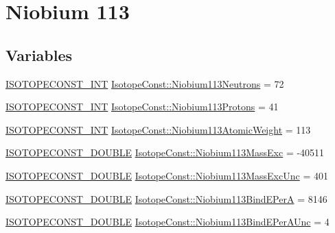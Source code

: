 \hypertarget{group___isotope_const-_niobium-_nb113}{}\section{Niobium 113}
\label{group___isotope_const-_niobium-_nb113}
\subsection*{Variables}
\begin{DoxyCompactItemize}
\item 
\mbox{\hyperlink{group___isotope_const-_macros_ga5f18360b3e99483a35c32d789e62621c}{I\+S\+O\+T\+O\+P\+E\+C\+O\+N\+S\+T\+\_\+\+I\+NT}} \mbox{\hyperlink{group___isotope_const-_niobium-_nb113_ga5322e770be1b10939fe8ea9e373ab884}{Isotope\+Const\+::\+Niobium113\+Neutrons}} = 72
\item 
\mbox{\hyperlink{group___isotope_const-_macros_ga5f18360b3e99483a35c32d789e62621c}{I\+S\+O\+T\+O\+P\+E\+C\+O\+N\+S\+T\+\_\+\+I\+NT}} \mbox{\hyperlink{group___isotope_const-_niobium-_nb113_gabbebea2fefdadbde0b1c22a75418cbb8}{Isotope\+Const\+::\+Niobium113\+Protons}} = 41
\item 
\mbox{\hyperlink{group___isotope_const-_macros_ga5f18360b3e99483a35c32d789e62621c}{I\+S\+O\+T\+O\+P\+E\+C\+O\+N\+S\+T\+\_\+\+I\+NT}} \mbox{\hyperlink{group___isotope_const-_niobium-_nb113_gab1531942198913e0e56090a687e421e2}{Isotope\+Const\+::\+Niobium113\+Atomic\+Weight}} = 113
\item 
\mbox{\hyperlink{group___isotope_const-_macros_ga8f45a7272ce02c0b4c65c44636ed719a}{I\+S\+O\+T\+O\+P\+E\+C\+O\+N\+S\+T\+\_\+\+D\+O\+U\+B\+LE}} \mbox{\hyperlink{group___isotope_const-_niobium-_nb113_gab9591028c5cc898a9840b3323791326d}{Isotope\+Const\+::\+Niobium113\+Mass\+Exc}} = -\/40511
\item 
\mbox{\hyperlink{group___isotope_const-_macros_ga8f45a7272ce02c0b4c65c44636ed719a}{I\+S\+O\+T\+O\+P\+E\+C\+O\+N\+S\+T\+\_\+\+D\+O\+U\+B\+LE}} \mbox{\hyperlink{group___isotope_const-_niobium-_nb113_gac64015573bd5edd4ae197585b3d51e33}{Isotope\+Const\+::\+Niobium113\+Mass\+Exc\+Unc}} = 401
\item 
\mbox{\hyperlink{group___isotope_const-_macros_ga8f45a7272ce02c0b4c65c44636ed719a}{I\+S\+O\+T\+O\+P\+E\+C\+O\+N\+S\+T\+\_\+\+D\+O\+U\+B\+LE}} \mbox{\hyperlink{group___isotope_const-_niobium-_nb113_ga79510aee5fe18feb6261d11585612c91}{Isotope\+Const\+::\+Niobium113\+Bind\+E\+PerA}} = 8146
\item 
\mbox{\hyperlink{group___isotope_const-_macros_ga8f45a7272ce02c0b4c65c44636ed719a}{I\+S\+O\+T\+O\+P\+E\+C\+O\+N\+S\+T\+\_\+\+D\+O\+U\+B\+LE}} \mbox{\hyperlink{group___isotope_const-_niobium-_nb113_ga5871667272c33110ca1236c5a9324ee3}{Isotope\+Const\+::\+Niobium113\+Bind\+E\+Per\+A\+Unc}} = 4

\end{DoxyCompactItemize}
